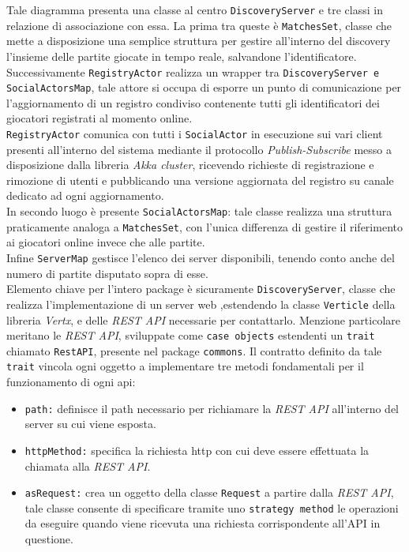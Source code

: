      Tale diagramma presenta una classe al centro \texttt{DiscoveryServer} e tre classi in relazione di associazione con essa.
     La prima tra queste è \texttt{MatchesSet}, classe che mette a disposizione una semplice struttura per gestire all'interno del discovery l'insieme delle partite giocate in tempo reale, salvandone l'identificatore.\\
     Successivamente \texttt{RegistryActor} realizza un wrapper tra \texttt{DiscoveryServer e SocialActorsMap}, tale attore si occupa di esporre un punto di comunicazione per l'aggiornamento di un registro condiviso contenente tutti gli identificatori dei giocatori registrati al momento online.\\ \texttt{RegistryActor} comunica con tutti i \texttt{SocialActor} in esecuzione sui vari client presenti all'interno del sistema mediante il protocollo \textit{Publish-Subscribe} messo a disposizione dalla libreria \textit{Akka cluster}, ricevendo richieste di registrazione e rimozione di utenti e pubblicando una versione aggiornata del registro su canale dedicato ad ogni aggiornamento.\\
     In secondo luogo è presente \texttt{SocialActorsMap}: tale classe realizza una struttura praticamente analoga a \texttt{MatchesSet}, con l'unica differenza di gestire il riferimento ai giocatori online invece che alle partite.\\
     Infine \texttt{ServerMap} gestisce l'elenco dei server disponibili, tenendo conto anche del numero di partite disputato sopra di esse.\\
     Elemento chiave per l'intero package è sicuramente \texttt{DiscoveryServer}, classe che realizza l'implementazione di un server web ,estendendo la classe \texttt{Verticle} della libreria \textit{Vertx}, e delle \textit{REST API} necessarie per contattarlo.
     Menzione particolare meritano le \textit{REST API}, sviluppate come \texttt{case objects} estendenti un \texttt{trait} chiamato \texttt{RestAPI}, presente nel package \texttt{commons}. Il contratto definito da tale \texttt{trait} vincola ogni oggetto a implementare tre metodi fondamentali per il funzionamento di ogni api:
     \begin{itemize}
       \item{\texttt{path:}} definisce il path necessario per richiamare la \textit{REST API} all'interno del server su cui viene esposta.

       \item{\texttt{httpMethod:}} specifica la richiesta http con cui deve essere effettuata la chiamata alla \textit{REST API}.

       \item{\texttt{asRequest:}} crea un oggetto della classe \texttt{Request} a partire dalla \textit{REST API}, tale classe consente di specificare tramite uno \texttt{strategy method} le operazioni da eseguire quando viene ricevuta una richiesta corrispondente all'API in questione.
     \end{itemize}

